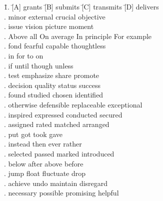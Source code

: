 \begin{tabbing}
\hspace{0cm}
\=1.  \quad\= [A] grants \quad\quad\= [B] submits \quad\quad\= [C] transmits \quad\quad\= [D] delivers\\
.  \> [A] minor     \> [B] external   \> [C] crucial      \> [D] objective\\
.  \> [A] issue     \> [B] vision     \> [C] picture      \> [D] moment\\
.  \> [A] Above all \> [B] On average \> [C] In principle \> [D] For example\\
.  \> [A] fond      \> [B] fearful    \> [C] capable      \> [D] thoughtless\\
.  \> [A] in        \> [B] for        \> [C] to           \> [D] on\\
.  \> [A] if        \> [B] until      \> [C] though       \> [D] unless\\
.  \> [A] test      \> [B] emphasize  \> [C] share        \> [D] promote\\
.  \> [A] decision  \> [B] quality    \> [C] status       \> [D] success\\
. \> [A] found     \> [B] studied    \> [C] chosen       \> [D] identified\\
. \> [A] otherwise \> [B] defensible \> [C] replaceable  \> [D] exceptional\\
. \> [A] inspired  \> [B] expressed  \> [C] conducted    \> [D] secured\\
. \> [A] assigned  \> [B] rated      \> [C] matched      \> [D] arranged\\
. \> [A] put       \> [B] got        \> [C] took         \> [D] gave\\
. \> [A] instead   \> [B] then       \> [C] ever         \> [D] rather\\
. \> [A] selected  \> [B] passed     \> [C] marked       \> [D] introduced\\
. \> [A] below     \> [B] after      \> [C] above        \> [D] before\\
. \> [A] jump      \> [B] float      \> [C] fluctuate    \> [D] drop\\
. \> [A] achieve   \> [B] undo       \> [C] maintain     \> [D] disregard\\
. \> [A] necessary \> [B] possible   \> [C] promising    \> [D] helpful
\end{tabbing}
